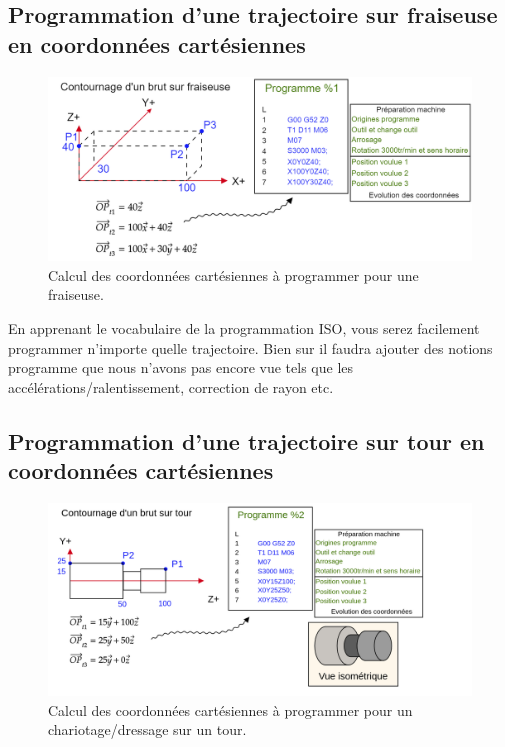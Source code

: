 \documentclass[
	11pt, %
	fleqn, %
	a4paper, %
]{LegrandOrangeBook}
\begin{document}
\subsection*{Programmation d'une trajectoire sur fraiseuse en coordonnées cartésiennes}



\begin{figure}[H] %
	\centering %
	\includegraphics[width=1\textwidth]{Images/cart3.png} %
	\caption{Calcul des coordonnées cartésiennes à programmer pour une fraiseuse.}
	\label{cart3} %
\end{figure}

En apprenant le vocabulaire de la programmation ISO, vous serez facilement programmer n'importe quelle trajectoire. Bien sur il faudra ajouter des notions programme que nous n'avons pas encore vue tels que les accélérations/ralentissement, correction de rayon etc.


\subsection*{Programmation d'une trajectoire sur tour en coordonnées cartésiennes}


\begin{figure}[H] %
	\centering %
	\includegraphics[width=1\textwidth]{Images/cart4.png} %
	\caption{Calcul des coordonnées cartésiennes à programmer pour un chariotage/dressage sur un tour.}
	\label{cart4} %
\end{figure}
\end{document}
